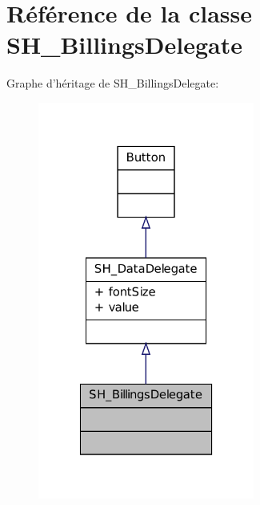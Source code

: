 \hypertarget{classSH__BillingsDelegate}{\section{Référence de la classe S\-H\-\_\-\-Billings\-Delegate}
\label{classSH__BillingsDelegate}
}


Graphe d'héritage de S\-H\-\_\-\-Billings\-Delegate\-:
\nopagebreak
\begin{figure}[H]
\begin{center}
\leavevmode
\includegraphics[width=202pt]{classSH__BillingsDelegate__inherit__graph}
\end{center}
\end{figure}


